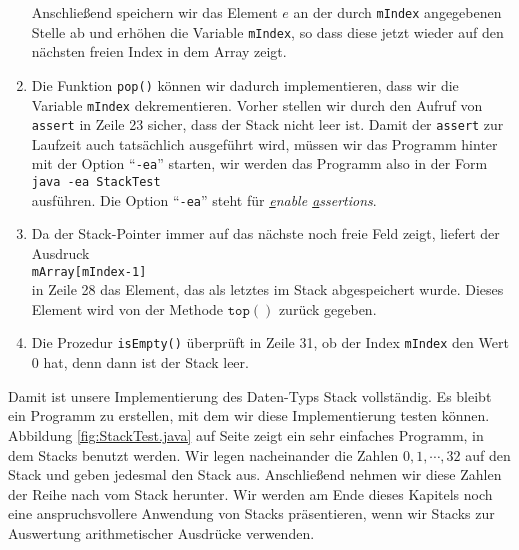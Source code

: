 \begin{enumerate}
      Anschlie{\ss}end speichern wir das Element $e$ an der durch \texttt{mIndex}
      angegebenen Stelle ab und erh\"ohen die Variable \texttt{mIndex}, so dass diese jetzt 
      wieder auf den n\"achsten freien Index in dem Array zeigt.
\item Die Funktion \texttt{pop()} k\"onnen wir dadurch implementieren, dass wir
      die Variable \texttt{mIndex} dekrementieren.  Vorher stellen wir durch den Aufruf 
      von \texttt{assert} in Zeile 23 sicher, dass der Stack nicht leer ist.
      Damit der \texttt{assert} zur Laufzeit auch tats\"achlich ausgef\"uhrt wird,
      m\"ussen wir das Programm hinter mit der Option ``\texttt{-ea}'' starten, wir werden das
      Programm also in der Form
      \\[0.2cm]
      \hspace*{1.3cm}
      \texttt{java -ea StackTest}
      \\[0.2cm]
      ausf\"uhren.  Die Option ``\texttt{-ea}'' steht f\"ur 
      \emph{\underline{e}nable \underline{a}ssertions}.
\item Da der Stack-Pointer immer auf das n\"achste noch freie Feld zeigt,
      liefert der Ausdruck \\[0.1cm]
      \hspace*{1.3cm} \texttt{mArray[mIndex-1]} \\[0.1cm]
      in Zeile 28 das Element, das als letztes im Stack abgespeichert wurde.
      Dieses Element wird von der Methode $\mathtt{top}()$ zur\"uck gegeben.
\item Die Prozedur \texttt{isEmpty()} \"uberpr\"uft in Zeile 31, ob der Index
      \texttt{mIndex} den Wert 0 hat, denn dann ist der Stack leer.
\end{enumerate}
Damit ist unsere Implementierung des Daten-Typs Stack vollst\"andig.  Es bleibt
ein Programm zu erstellen, mit dem wir diese Implementierung testen k\"onnen.
Abbildung \ref{fig:StackTest.java} auf Seite \pageref{fig:StackTest.java}
zeigt ein sehr einfaches Programm, in dem Stacks benutzt werden.  
Wir legen nacheinander die Zahlen $0, 1, \cdots, 32$
auf den Stack und geben jedesmal den Stack aus.  Anschlie{\ss}end nehmen wir diese Zahlen der
Reihe nach vom Stack herunter.
Wir werden am Ende dieses Kapitels noch eine anspruchsvollere Anwendung von Stacks
pr\"asentieren, wenn wir Stacks zur Auswertung arithmetischer Ausdr\"ucke verwenden.


